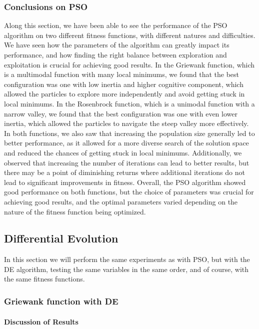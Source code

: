 \documentclass[12pt,a4paper]{article}
\begin{document}
\subsubsection{Conclusions on PSO}
Along this section, we have been able to see the performance of the PSO algorithm on two different fitness functions, with different natures and difficulties. We have seen how the parameters of the algorithm can greatly impact its performance, and how finding the right balance between exploration and exploitation is crucial for achieving good results.
In the Griewank function, which is a multimodal function with many local minimums, we found that the best configuration was one with low inertia and higher cognitive component, which allowed the particles to explore more independently and avoid getting stuck in local minimums. In the Rosenbrock function, which is a unimodal function with a narrow valley, we found that the best configuration was one with even lower inertia, which allowed the particles to navigate the steep valley more effectively.
In both functions, we also saw that increasing the population size generally led to better performance, as it allowed for a more diverse search of the solution space and reduced the chances of getting stuck in local minimums. Additionally, we observed that increasing the number of iterations can lead to better results, but there may be a point of diminishing returns where additional iterations do not lead to significant improvements in fitness.
Overall, the PSO algorithm showed good performance on both functions, but the choice of parameters was crucial for achieving good results, and the optimal parameters varied depending on the nature of the fitness function being optimized.

\subsection{Differential Evolution }
In this section we will perform the same experiments as with PSO, but with the DE algorithm, testing the same variables in the same order, and of course, with the same fitness functions.

\subsubsection{Griewank function with DE}
\paragraph{Discussion of Results}
\end{document}
